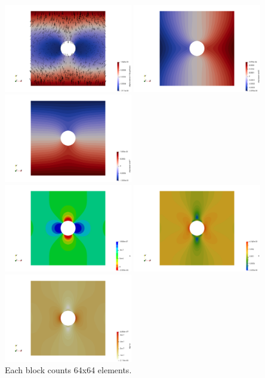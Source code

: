 \begin{center}
\includegraphics[width=5.6cm]{python_codes/fieldstone_124/results/exp1/disp}
\includegraphics[width=5.6cm]{python_codes/fieldstone_124/results/exp1/disp_x}
\includegraphics[width=5.6cm]{python_codes/fieldstone_124/results/exp1/disp_y}\\
\includegraphics[width=5.6cm]{python_codes/fieldstone_124/results/exp1/press}
\includegraphics[width=5.6cm]{python_codes/fieldstone_124/results/exp1/e}
\includegraphics[width=5.6cm]{python_codes/fieldstone_124/results/exp1/sigma}\\
{\captionfont Each block counts 64x64 elements.}
\end{center}



